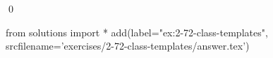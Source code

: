 
\begin{ex}
  \label{ex:2-72-class-templates}
  
  \qed
\end{ex}
\begin{python0}
from solutions import *
add(label="ex:2-72-class-templates",
    srcfilename='exercises/2-72-class-templates/answer.tex')
\end{python0}
